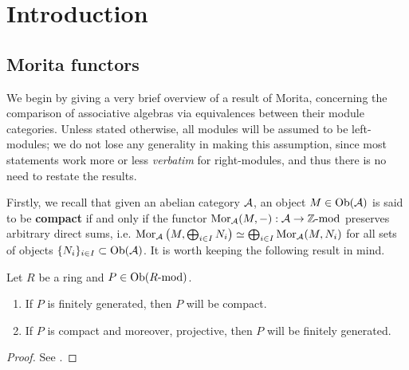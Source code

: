 \section{Introduction}
    \subsection{Morita functors}
        We begin by giving a very brief overview of a result of Morita, concerning the comparison of associative algebras via equivalences between their module categories. Unless stated otherwise, all modules will be assumed to be left-modules; we do not lose any generality in making this assumption, since most statements work more or less \textit{verbatim} for right-modules, and thus there is no need to restate the results.
        
        Firstly, we recall that given an abelian category $\mathcal{A}$, an object $M \in \mathrm{Ob}(\mathcal{A})$ is said to be \textbf{compact} if and only if the functor $\mathrm{Mor}_{\mathcal{A}}(M, -): \mathcal{A} \to \mathbb{Z}\text{-}\mathrm{mod}$ preserves arbitrary direct sums, i.e. $\mathrm{Mor}_{\mathcal{A}}\left(M, \bigoplus_{i \in I} N_i\right) \simeq \bigoplus_{i \in I} \mathrm{Mor}_{\mathcal{A}}(M, N_i)$ for all sets of objects $\{N_i\}_{i \in I} \subset \mathrm{Ob}(\mathcal{A})$. It is worth keeping the following result in mind.
        \begin{lemma} \label{lemma: finitely_generated_modules_are_compact}
            Let $R$ be a ring and $P \in \mathrm{Ob}(R\text{-}\mathrm{mod})$.
            \begin{enumerate}
                \item If $P$ is finitely generated, then $P$ will be compact.
                \item If $P$ is compact and moreover, projective, then $P$ will be finitely generated.
            \end{enumerate}
        \end{lemma}
            \begin{proof}
                See \cite[Lemma 2.1.6]{ginzburg_lectures_on_noncommutative_geometry}.
            \end{proof}
        
